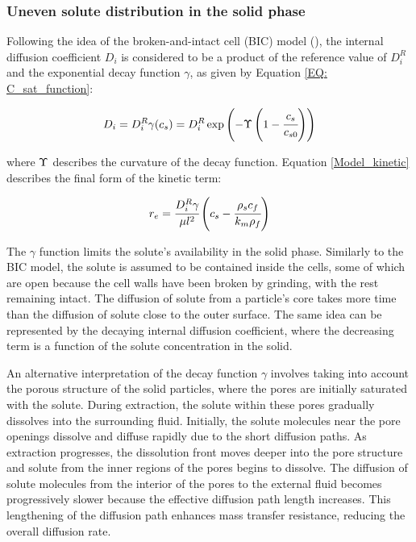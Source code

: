 \documentclass[a4paper,fleqn]{cas-dc}
\begin{document}
		\subsubsection{Uneven solute distribution in the solid phase} \label{CH: Gamma_Function}
		
		Following the idea of the broken-and-intact cell (BIC) model (\citet{Sovova2017}), the internal diffusion coefficient $D_i$ is considered to be a product of the reference value of $D_i^R$ and the exponential decay function $\gamma$, as given by Equation \ref{EQ: C_sat_function}:
		
		{\footnotesize
			\begin{equation}
				D_i = D_i^R \gamma(c_s) = D_i^R \exp \left( - \Upsilon \left( 1-\cfrac{ c_s }{c_{s0}} \right) \right) \label{EQ: C_sat_function}
		\end{equation} }
		
		where  ${\color{black}\Upsilon}$ describes the curvature of the decay function. Equation \ref{Model_kinetic} describes the final form of the kinetic term:
		
		{\footnotesize
			\begin{equation}
				\label{Model_kinetic}
				r_e = \cfrac{D_i^R \gamma }{ \mu l^2 } \left( c_s  - \cfrac{\rho_s c_f }{ k_m \rho_f }  \right)
		\end{equation} }
		
		The $\gamma$ function limits the solute's availability in the solid phase. Similarly to the BIC model, the solute is assumed to be contained inside the cells, some of which are open because the cell walls have been broken by grinding, with the rest remaining intact. The diffusion of solute from a particle's core takes more time than the diffusion of solute close to the outer surface. The same idea can be represented by the decaying internal diffusion coefficient, where the decreasing term is a function of the solute concentration in the solid. 
		
		An alternative interpretation of the decay function $\gamma$ involves taking into account the porous structure of the solid particles, where the pores are initially saturated with the solute. During extraction, the solute within these pores gradually dissolves into the surrounding fluid. Initially, the solute molecules near the pore openings dissolve and diffuse rapidly due to the short diffusion paths. As extraction progresses, the dissolution front moves deeper into the pore structure and solute from the inner regions of the pores begins to dissolve. The diffusion of solute molecules from the interior of the pores to the external fluid becomes progressively slower because the effective diffusion path length increases. This lengthening of the diffusion path enhances mass transfer resistance, reducing the overall diffusion rate. 
		
\end{document}
